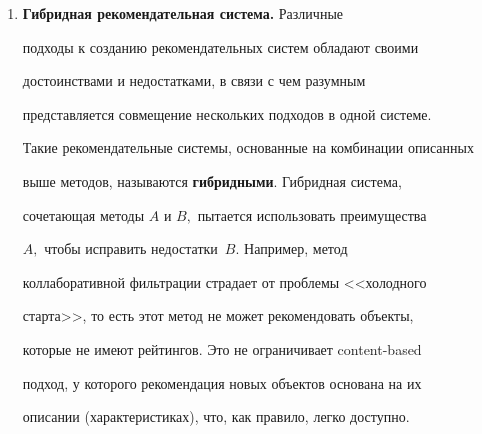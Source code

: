 \begin{enumerate}[1.]
текстов (Latent Semantic Analysis, случайное индексирование~\cite{sahlgren2005introduction} 


и~т.\,п.). Обработка


неструктурированных данных является очень сложной и не решенной до


конца задачей, что говорит о перспективности данного направления, но


в то же время и о необходимости крайне аккуратной работы с ними.


Структурированные же данные довольно легко представляются в


необходимом виде.





Следует отметить, что в классическом сontent-based подходе


используются исключительно данные о товарах, причем рекомендации


пользователю даются только на основе его личных покупок. Затем с


помощью  некой  меры  близости,  часто~--- коэффициента  Пирсона,


определяются  объекты, близкие  к  профилю  пользователя.





\item {\bf Гибридная рекомендательная система.} Различные


подходы к созданию рекомендательных систем обладают своими


достоинствами и недостатками, в связи с чем разумным


представляется совмещение нескольких подходов в одной системе.


Такие рекомендательные системы, основанные на комбинации описанных


выше методов, называются {\bf гибридными}. Гибридная система,


сочетающая методы $A$ и $B,$ пытается использовать преимущества


$A,$ чтобы исправить недостатки~$B.$ Например, метод


коллаборативной фильтрации страдает от проблемы <<холодного


старта>>, то есть этот метод не может рекомендовать объекты,


которые не имеют рейтингов. Это не ограничивает content-based


подход, у которого рекомендация новых объектов основана на их


описании (характеристиках), что, как правило, легко доступно.


\end{enumerate}





